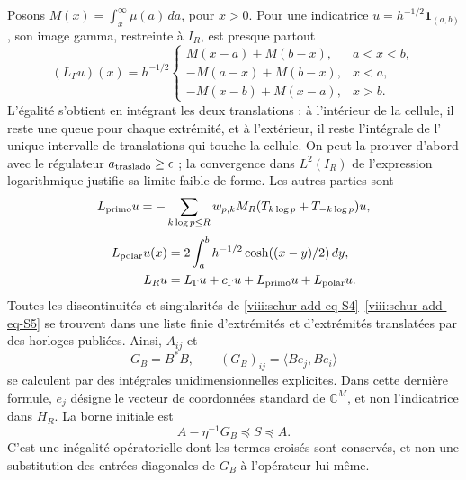 Posons \(M(x)=\int_x^\infty\mu(a)\,da\), pour \(x>0\). Pour une indicatrice \(u=h^{-1/2}\mathbf1_{(a,b)}\), son image gamma, restreinte à \(I_R\), est presque partout
\begin{equation}
(L_\Gamma u)(x)=h^{-1/2}
\begin{cases}
M(x-a)+M(b-x),&a<x<b,\\
-M(a-x)+M(b-x),&x<a,\\
-M(x-b)+M(x-a),&x>b.
\end{cases}
\label{viii:schur-add-eq-S4}
\end{equation}
L'égalité s'obtient en intégrant les deux translations : à l'intérieur de la
cellule, il reste une queue pour chaque extrémité, et à l'extérieur, il reste l'intégrale de l'
unique intervalle de translations qui touche la cellule. On peut la prouver d'abord
avec le régulateur \(a_{\rm traslado}\geq\epsilon\) ; la convergence dans
\(L^2(I_R)\) de l'expression logarithmique justifie sa limite faible de
forme. Les autres parties sont
\begin{equation}
L_{\rm primo}u=-\sum_{k\log p\leq R}w_{p,k}
M_R(T_{k\log p}+T_{-k\log p})u,
\label{viii:schur-add-display-11}
\end{equation}
\begin{equation}
\begin{aligned}
L_{\rm polar}u(x)&=2\int_a^b h^{-1/2}\cosh((x-y)/2)\,dy,\\
L_Ru&=L_\Gamma u+c_\Gamma u+L_{\rm primo}u+L_{\rm polar}u.
\end{aligned}
\label{viii:schur-add-eq-S5}
\end{equation}
Toutes les discontinuités et singularités de \eqref{viii:schur-add-eq-S4}--\eqref{viii:schur-add-eq-S5} se trouvent dans une liste finie d'extrémités et d'extrémités translatées par des horloges publiées. Ainsi, \(A_{ij}\) et
\begin{equation}
G_B=B^*B,\qquad (G_B)_{ij}=\langle Be_j,Be_i\rangle
\label{viii:schur-add-display-13}
\end{equation}
se calculent par des intégrales unidimensionnelles explicites. Dans cette dernière
formule, \(e_j\) désigne le vecteur de coordonnées standard de
\(\mathbb C^M\), et non l'indicatrice dans \(H_R\).
La borne initiale est
\begin{equation}
A-\eta^{-1}G_B\preceq S\preceq A.
\label{viii:schur-add-eq-S6}
\end{equation}
C'est une inégalité opératorielle dont les termes croisés sont conservés, et non une substitution des entrées diagonales de \(G_B\) à l'opérateur lui-même.

